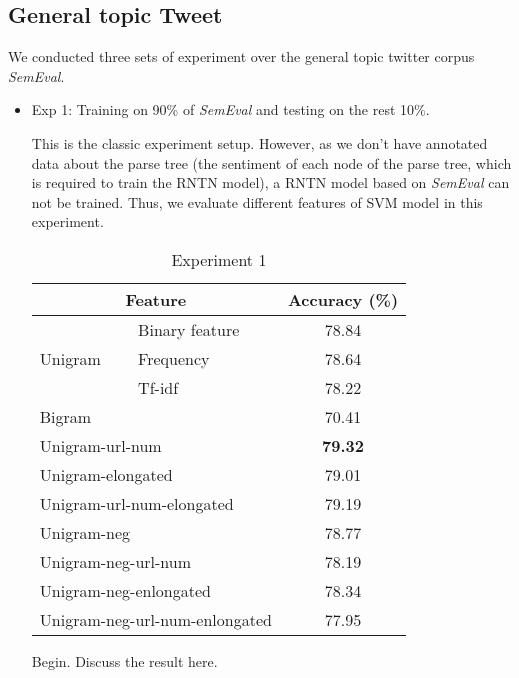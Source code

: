 \subsection{General topic Tweet}
We conducted three sets of experiment over the general topic twitter corpus \textit{SemEval}. 
\begin{itemize}
\item Exp 1: Training on 90\% of \textit{SemEval} and testing on the rest 10\%. 

This is the classic experiment setup. However, as we don't have annotated data about the parse tree (the sentiment of each node of the parse tree, which is required to train the RNTN model), a RNTN model based on \textit{SemEval} can not be trained. Thus, we evaluate different features of SVM model in this experiment. 

\begin{table}[H]
  \begin{center}
    \begin{tabular}{llc}\hline
     \multicolumn{2}{c}{Feature} & Accuracy (\%)     \\\hline
     \multirow{3}{*}{Unigram}    & Binary feature  &  78.84  \\ 
                                 & Frequency       &  78.64  \\ 
                                 & Tf-idf          &  78.22 \\
     \multicolumn{2}{l}{Bigram}                    &  70.41 \\    
     \multicolumn{2}{l}{Unigram-url-num}           &  \textbf{79.32} \\
     \multicolumn{2}{l}{Unigram-elongated}         &  79.01 \\
     \multicolumn{2}{l}{Unigram-url-num-elongated} &  79.19 \\
     \multicolumn{2}{l}{Unigram-neg}               &  78.77 \\
     \multicolumn{2}{l}{Unigram-neg-url-num}       &  78.19 \\
     \multicolumn{2}{l}{Unigram-neg-enlongated}    &  78.34 \\
     \multicolumn{2}{l}{Unigram-neg-url-num-enlongated}  &  77.95 \\\hline      
    \end{tabular}
    \end{center}
    \caption{\label{exp5_1} Experiment 1}
\end{table}

Begin. \vspace{5cm} Discuss the result here. 



\end{itemize}
